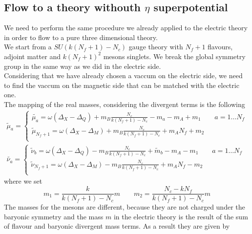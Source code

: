 \subsection{Flow to a theory withouth $\eta$ superpotential}
We need to perform the same procedure we already applied to the electric theory in order to flow to a pure three dimensional theory.\\
We start from a $SU( k(N_f +1) - N_c)$ gauge theory with $N_f +1$ flavours, adjoint matter and $k (N_f +1)^2$ mesons singlets.
We break the global symmetry group in the same way as we did in the electric side.\\
Considering that we have already chosen a vaccum on the electric side, we need to find the vaccum on the magnetic side that can be matched with the electric one.\\
The mapping of the real masses, considering the divergent terms is the following
\begin{equation}
\begin{aligned}
	 \tilde \mu_a =
	 \begin{cases}
		\tilde{ \mu_a} =  \omega ( \Delta_X - \Delta_Q ) + m_B \frac{N_c}{k(N_f +1) - N_c} - m_a  - m_A + m_1  \qquad a = 1 \dots N_f \\
		\tilde \mu_{N_f+1} =  \omega ( \Delta_X - \Delta_M ) + m_B \frac{N_c}{k(N_f +1) - N_c} +  m_A N_f + m_2    \\
	 \end{cases}
	 \\
	 \tilde{ \nu_a} =
	\begin{cases}
	\tilde{\nu}_b = \omega ( \Delta_X - \Delta_Q ) - m_B \frac{N_c}{k(N_f +1) - N_c}  + \tilde m_b  - m_A - m_1 \qquad a = 1 \dots N_f\\
	 \tilde \nu_{N_f+1} = \omega ( \Delta_X - \Delta_M ) - m_B \frac{N_c}{k(N_f +1) - N_c}  +  m_A N_f- m_2 \\
	\end{cases}
\end{aligned}
\end{equation}
where we set 
\begin{equation}
m_1  = \frac{k}{k(N_f+1)-N_c} m  \qquad
m_2  =  \frac{N_c - k N_f}{k(N_f+1)-N_c} m
\end{equation}
The masses for the mesons are different, because they are not charged under the baryonic symmetry and the mass $m$ in the electric theory is the result of the sum of flavour and baryonic divergent mass terms.
As a result they are given by
